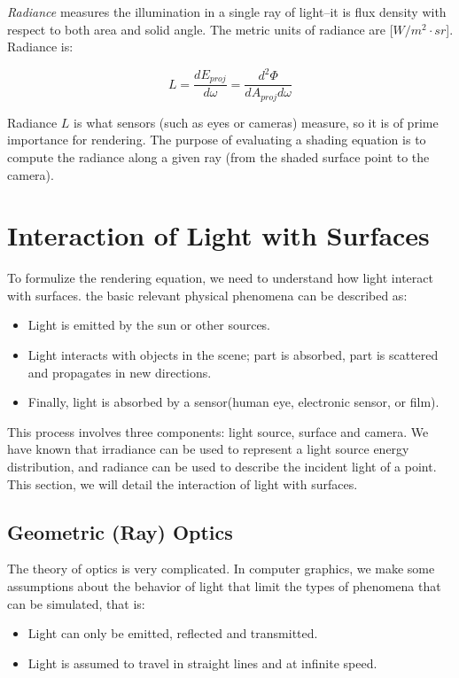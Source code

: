 \textit{Radiance} measures the illumination in a single ray of light--it is flux density with respect to both area and solid angle. The metric units of radiance are [$W/m^2 \cdot sr$]. Radiance is:

\begin{equation}
	L=\frac{dE_{proj}}{d\omega}=\frac{d^2 \Phi}{dA_{proj}d\omega}
\end{equation}

Radiance $L$ is what sensors (such as eyes or cameras) measure, so it is of prime importance for rendering. The purpose of evaluating a shading equation is to compute the radiance along a given ray (from the shaded surface point to the camera).


\section{Interaction of Light with Surfaces}
To formulize the rendering equation, we need to understand how light interact with surfaces. the basic relevant physical phenomena can be described as:

\begin{itemize}
	\item Light is emitted by the sun or other sources.
	\item Light interacts with objects in the scene; part is absorbed, part is scattered and propagates in new directions.
	\item Finally, light is absorbed by a sensor(human eye, electronic sensor, or film).
\end{itemize}

This process involves three components: light source, surface and camera. We have known that irradiance can be used to represent a light source energy distribution, and radiance can be used to describe the incident light of a point. This section, we will detail the interaction of light with surfaces.

\subsection{Geometric (Ray) Optics}

The theory of optics is very complicated. In computer graphics, we make some assumptions about the behavior of light that limit the types of phenomena that can be simulated, that is:

\begin{itemize}
	\item Light can only be emitted, reflected and transmitted.
	\item Light is assumed to travel in straight lines and at infinite speed.
\end{itemize} 


